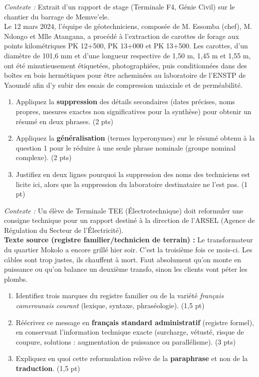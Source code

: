 \documentclass[11pt]{article}
\begin{document}
\begin{exercice}
\textit{Contexte :} Extrait d'un rapport de stage (Terminale F4, Génie Civil) sur le chantier du barrage de Memve'ele. \\
\og Le 12 mars 2024, l'équipe de géotechniciens, composée de M. Essomba (chef), M. Ndongo et Mlle Atangana, a procédé à l'extraction de carottes de forage aux points kilométriques PK 12+500, PK 13+000 et PK 13+500. Les carottes, d'un diamètre de 101,6 mm et d'une longueur respective de 1,50 m, 1,45 m et 1,55 m, ont été minutieusement étiquetées, photographiées, puis conditionnées dans des boîtes en bois hermétiques pour être acheminées au laboratoire de l'ENSTP de Yaoundé afin d'y subir des essais de compression uniaxiale et de perméabilité. \fg{}

\begin{enumerate}
    \item Appliquez la \textbf{suppression} des détails secondaires (dates précises, noms propres, mesures exactes non significatives pour la synthèse) pour obtenir un résumé en deux phrases. (2 pts)
    \item Appliquez la \textbf{généralisation} (termes hyperonymes) sur le résumé obtenu à la question 1 pour le réduire à une seule phrase nominale (groupe nominal complexe). (2 pts)
    \item Justifiez en deux lignes pourquoi la suppression des noms des techniciens est licite ici, alors que la suppression du laboratoire destinataire ne l'est pas. (1 pt)
\end{enumerate}
\end{exercice}

\begin{exercice}
\textit{Contexte :} Un élève de Terminale TEE (Électrotechnique) doit reformuler une consigne technique pour un rapport destiné à la direction de l'ARSEL (Agence de Régulation du Secteur de l'Électricité). \\
\textbf{Texte source (registre familier/technicien de terrain) :} \og Le transformateur du quartier Mokolo a encore grillé hier soir. C'est la troisième fois ce mois-ci. Les câbles sont trop justes, ils chauffent à mort. Faut absolument qu'on monte en puissance ou qu'on balance un deuxième transfo, sinon les clients vont péter les plombs. \fg{}

\begin{enumerate}
    \item Identifiez trois marques du registre familier ou de la variété \textit{français camerounais courant} (lexique, syntaxe, phraséologie). (1,5 pt)
    \item Réécrivez ce message en \textbf{français standard administratif} (registre formel), en conservant l'information technique exacte (surcharge, vétusté, risque de coupure, solutions : augmentation de puissance ou parallélisme). (3 pts)
    \item Expliquez en quoi cette reformulation relève de la \textbf{paraphrase} et non de la \textbf{traduction}. (1,5 pt)
\end{enumerate}
\end{exercice}
\end{document}
